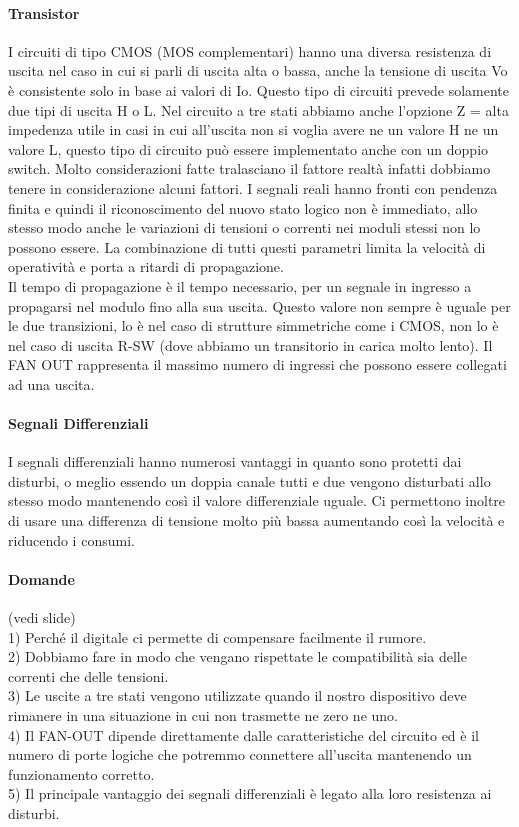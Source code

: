 \documentclass[12pt]{article}
\begin{document}
\paragraph{Transistor}
I circuiti di tipo CMOS (MOS complementari) hanno una diversa resistenza di uscita nel caso in cui si parli di uscita alta o bassa, anche la tensione di uscita Vo è consistente solo in base ai valori di Io. Questo tipo di circuiti prevede solamente due tipi di uscita H o L. Nel circuito a tre stati abbiamo anche l’opzione Z = alta impedenza utile in casi in cui all’uscita non si voglia avere ne un valore H ne un valore L, questo tipo di circuito può essere implementato anche con un doppio switch. Molto considerazioni fatte tralasciano il fattore realtà infatti dobbiamo tenere in considerazione alcuni fattori. I segnali reali hanno fronti con pendenza finita e quindi il riconoscimento del nuovo stato logico non è immediato, allo stesso modo anche le variazioni di tensioni o correnti nei moduli stessi non lo possono essere. La combinazione di tutti questi parametri limita la velocità di operatività e porta a ritardi di propagazione.\\
Il tempo di propagazione è il tempo necessario, per un segnale in ingresso a propagarsi nel modulo fino alla sua uscita. Questo valore non sempre è uguale per le due transizioni, lo è nel caso di strutture simmetriche come i CMOS, non lo è nel caso di uscita R-SW (dove abbiamo un transitorio in carica molto lento). Il FAN OUT rappresenta il massimo numero di ingressi che possono essere collegati ad una uscita.
\paragraph{Segnali Differenziali}
I segnali differenziali hanno numerosi vantaggi in quanto sono protetti dai disturbi, o meglio essendo un doppia canale tutti e due vengono disturbati allo stesso modo mantenendo così il valore differenziale uguale. Ci permettono inoltre di usare una differenza di tensione molto più bassa aumentando così la velocità e riducendo i consumi.

\paragraph{Domande}
(vedi slide)\\
1) Perché il digitale ci permette di compensare facilmente il rumore.\\
2) Dobbiamo fare in modo che vengano rispettate le compatibilità sia delle correnti che delle tensioni.\\
3) Le uscite a tre stati vengono utilizzate quando il nostro dispositivo deve rimanere in una situazione in cui non trasmette ne zero ne uno.\\
4) Il FAN-OUT dipende direttamente dalle caratteristiche del circuito ed è il numero di porte logiche che potremmo connettere all’uscita mantenendo un funzionamento corretto.\\
5) Il principale vantaggio dei segnali differenziali è legato alla loro resistenza ai disturbi.
\end{document}
